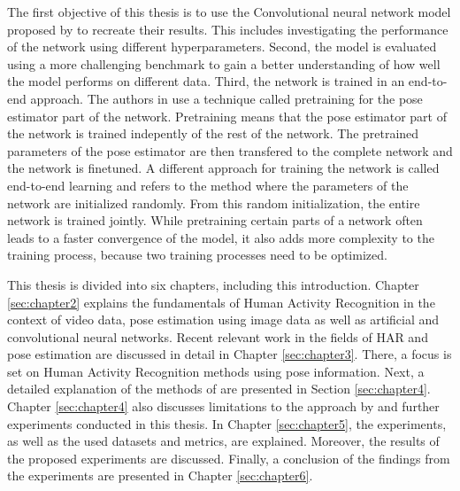 The first objective of this thesis is to use the Convolutional neural network model proposed by \cite{luvizon_2d/3d_2018} to recreate their results.
This includes investigating the performance of the network using different hyperparameters.
Second, the model is evaluated using a more challenging benchmark to gain a better understanding of how well the model performs on different data.
Third, the network is trained in an end-to-end approach.
The authors in \cite{luvizon_2d/3d_2018} use a technique called pretraining for the pose estimator part of the network.
Pretraining means that the pose estimator part of the network is trained indepently of the rest of the network.
The pretrained parameters of the pose estimator are then transfered to the complete network and the network is finetuned.
A different approach for training the network is called end-to-end learning and refers to the method where the parameters of the network are initialized randomly.
From this random initialization, the entire network is trained jointly.
While pretraining certain parts of a network often leads to a faster convergence of the model, it also adds more complexity to the training process, because two training processes need to be optimized.

This thesis is divided into six chapters, including this introduction.
Chapter \ref{sec:chapter2} explains the fundamentals of Human Activity Recognition in the context of video data, pose estimation using image data as well as artificial and convolutional neural networks.
Recent relevant work in the fields of HAR and pose estimation are discussed in detail in Chapter \ref{sec:chapter3}.
There, a focus is set on Human Activity Recognition methods using pose information.
Next, a detailed explanation of the methods of \cite{luvizon_2d/3d_2018} are presented in Section \ref{sec:chapter4}.
Chapter \ref{sec:chapter4} also discusses limitations to the approach by \cite{luvizon_2d/3d_2018} and further experiments conducted in this thesis.
In Chapter \ref{sec:chapter5}, the experiments, as well as the used datasets and metrics, are explained.
Moreover, the results of the proposed experiments are discussed.
Finally, a conclusion of the findings from the experiments are presented in Chapter \ref{sec:chapter6}.